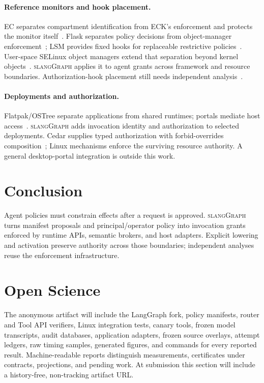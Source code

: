 \documentclass[letterpaper,twocolumn,10pt]{article}
\newcommand{\sys}{\textsc{slangGraph}\xspace}
\begin{document}
\paragraph{Reference monitors and hook placement.}
EC separates compartment identification from ECK's enforcement and protects
the monitor itself~\cite{khan2023ec}. Flask separates policy decisions from
object-manager enforcement~\cite{spencer1999flask}; LSM provides fixed hooks for
replaceable restrictive policies~\cite{wright2002lsm,linuxlsm}. User-space SELinux
object managers extend that separation beyond kernel
objects~\cite{selinuxnotebook,sepgsql}. \sys applies it to agent grants across
framework and resource boundaries. Authorization-hook placement still needs
independent analysis~\cite{zhang2002cqual}.

\paragraph{Deployments and authorization.}
Flatpak/OSTree separate applications from shared runtimes; portals mediate host
access~\cite{flatpak,ostree,portals}. \sys adds invocation identity and
authorization to selected deployments. Cedar supplies typed authorization with
forbid-overrides composition~\cite{cedar}; Linux mechanisms enforce the surviving
resource authority. A general desktop-portal integration is outside this work.

\section{Conclusion}

Agent policies must constrain effects after a request is approved. \sys turns
manifest proposals and principal/operator policy into invocation grants enforced
by runtime APIs, semantic brokers, and host adapters. Explicit lowering and
activation preserve authority across those boundaries; independent analyses
reuse the enforcement infrastructure.




\appendix
\section{Open Science}

The anonymous artifact will include the LangGraph fork, policy manifests,
router and Tool API verifiers, Linux integration tests, canary tools, frozen
model transcripts, audit databases, application adapters, frozen source overlays,
attempt ledgers, raw timing samples, generated figures, and commands for every
reported result. Machine-readable reports distinguish measurements,
certificates under contracts, projections, and pending work. At submission this
section will include a history-free, non-tracking artifact URL.
\end{document}

